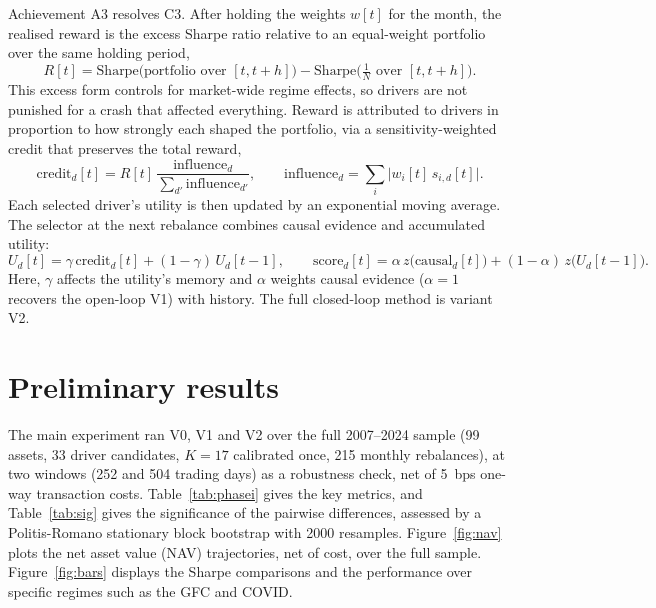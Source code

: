 \documentclass[12pt, a4paper]{report}
\begin{document}
Achievement A3 resolves C3. After holding the weights $w[t]$ for the month, the realised reward is
the excess Sharpe ratio relative to an equal-weight portfolio over the same holding period,
\begin{equation}
  R[t] = \text{Sharpe}\big(\text{portfolio over } [t, t{+}h]\big)
       - \text{Sharpe}\big(\tfrac{1}{N} \text{ over } [t, t{+}h]\big).
\end{equation}
This excess form controls for market-wide regime effects, so drivers are not punished for a crash
that affected everything. 
Reward is attributed to drivers in proportion to how strongly each shaped the
portfolio, via a sensitivity-weighted credit that preserves the total reward,
\begin{equation}
  \text{credit}_d[t] = R[t]\,\frac{\text{influence}_d}{\sum_{d'} \text{influence}_{d'}},
  \qquad
  \text{influence}_d = \sum_i \big| w_i[t]\, s_{i,d}[t] \big|.
\end{equation}
Each selected driver's utility is then updated by an exponential moving average. 
The selector at the next rebalance combines causal evidence and accumulated utility:
\begin{equation}
  U_d[t] = \gamma\, \text{credit}_d[t] + (1-\gamma)\, U_d[t-1],
  \qquad
  \text{score}_d[t] = \alpha\, z\big(\text{causal}_d[t]\big) + (1-\alpha)\, z\big(U_d[t-1]\big).
\end{equation}
Here, $\gamma$ affects the utility's memory and $\alpha$ weights causal evidence ($\alpha = 1$ recovers
the open-loop V1) with history. The full closed-loop method is variant V2.

\section{Preliminary results}
\label{sec:results}

The main experiment ran V0, V1 and V2 over the full 2007--2024 sample (99 assets, 33 driver candidates,
$K=17$ calibrated once, 215 monthly rebalances), at two windows (252 and
504 trading days) as a robustness check, net of 5~bps one-way transaction costs.
Table~\ref{tab:phasei} gives the key metrics, and Table~\ref{tab:sig} gives the significance of the
pairwise differences, assessed by a Politis-Romano stationary block bootstrap
\cite{politis1994stationary} with 2000 resamples.
Figure~\ref{fig:nav} plots the net asset value (NAV)
trajectories, net of cost, over the full sample. Figure~\ref{fig:bars} displays the Sharpe comparisons and the performance over specific regimes such as the GFC and COVID.
\end{document}

